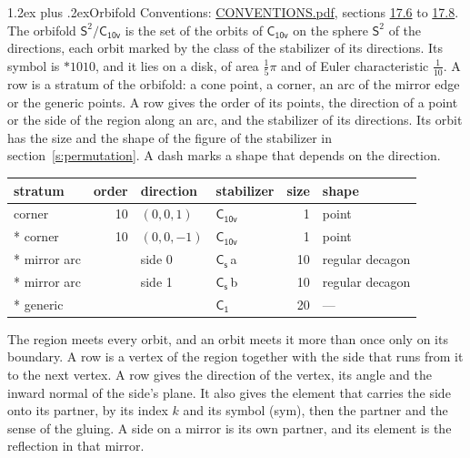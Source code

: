\documentclass[10pt,a4paper]{article}
\makeatletter
\renewcommand\section{\@startsection{section}{1}{\z@}{-3ex plus -1ex minus -.2ex}%
  {1.2ex plus .2ex}{\normalfont\large\sffamily\bfseries\color{parttitle}}}
\numberwithin{equation}{section}
\newcommand{\grp}[1]{\mathsf{#1}}
\newcommand{\orbname}[1]{#1}
\newcommand{\clsletter}[1]{\,{\scriptsize\color{black!55}#1}}
\newcommand{\dirvec}[3]{(#1, #2, #3)}
\newcommand{\twosphere}{\mathsf{S}^{2}}
\makeatother
\begin{document}
\section{Orbifold}\label{s:orbifold}
Conventions: \href{../../CONVENTIONS.pdf}{CONVENTIONS.pdf}, sections \href{../../CONVENTIONS.pdf\#conv.17.6}{17.6} to \href{../../CONVENTIONS.pdf\#conv.17.8}{17.8}.
The orbifold $\twosphere/\grp{C_{10v}}$ is the set of the orbits of $\grp{C_{10v}}$ on the sphere $\twosphere$ of the directions, each orbit marked by the class of the stabilizer of its directions. Its symbol is $\orbname{{\ast}1010}$, and it lies on a disk, of area $\tfrac{1}{5}\pi$ and of Euler characteristic $\tfrac{1}{10}$.
\leavevmode\label{n:head.stratum}\label{n:head.order.point}\label{n:head.direction}\label{n:head.stabilizer}\label{n:head.size.orbit}\label{n:head.shape}A row is a stratum of the orbifold: a cone point, a corner, an arc of the mirror edge or the generic points. A row gives the order of its points, the direction of a point or the side of the region along an arc, and the stabilizer of its directions. Its orbit has the size and the shape of the figure of the stabilizer in section~\ref{s:permutation}. A dash marks a shape that depends on the direction.
{\small\setlength{\tabcolsep}{4pt}\begin{longtable}{@{}lrllrl@{}}\toprule
stratum & order & direction & stabilizer & size & shape\\\midrule\endhead
\bottomrule\endfoot\endlastfoot
corner & 10 & $\dirvec{0}{0}{1}$ & \href{C10v.pdf}{$\grp{C_{10v}}$} & 1 & point\\*
corner & 10 & $\dirvec{0}{0}{-1}$ & \href{C10v.pdf}{$\grp{C_{10v}}$} & 1 & point\\*
mirror arc &  & side 0 & \href{C1v.pdf}{$\grp{C_{s}}$}\clsletter{a} & 10 & regular decagon\\*
mirror arc &  & side 1 & \href{C1v.pdf}{$\grp{C_{s}}$}\clsletter{b} & 10 & regular decagon\\*
generic &  &  & \href{C1.pdf}{$\grp{C_{1}}$} & 20 & ---\\
\bottomrule\end{longtable}}
\leavevmode\label{n:head.vertex.region}\label{n:head.angle}\label{n:head.normal.side}\label{n:head.partner}\label{n:head.sense}The region meets every orbit, and an orbit meets it more than once only on its boundary. A row is a vertex of the region together with the side that runs from it to the next vertex. A row gives the direction of the vertex, its angle and the inward normal of the side's plane. It also gives the element that carries the side onto its partner, by its index $k$ and its symbol (sym), then the partner and the sense of the gluing. A side on a mirror is its own partner, and its element is the reflection in that mirror.
\end{document}
